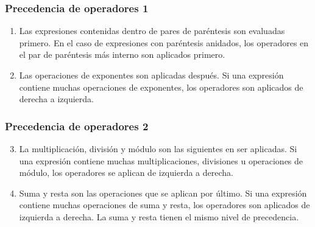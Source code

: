 \documentclass[12pt]{beamer}
\begin{document}
\begin{frame}
\frametitle{Precedencia de operadores 1}
\begin{enumerate}
\item Las expresiones contenidas dentro de pares de par\'{e}ntesis son evaluadas primero. En el caso de expresiones con par\'{e}ntesis anidados, los operadores en el par de par\'{e}ntesis m\'{a}s interno son aplicados primero.
\item Las operaciones de exponentes son aplicadas despu\'{e}s. Si una expresi\'{o}n contiene muchas operaciones de exponentes, los operadores son aplicados de derecha a izquierda.
\end{enumerate}
\end{frame}
\begin{frame}
\frametitle{Precedencia de operadores 2}
\begin{enumerate}
\setcounter{enumi}{2}
\item La multiplicaci\'{o}n, divisi\'{o}n y m\'{o}dulo son las siguientes en ser aplicadas. Si una expresi\'{o}n contiene muchas multiplicaciones, divisiones u operaciones de m\'{o}dulo, los operadores se aplican de izquierda a derecha.
\item Suma y resta son las operaciones que se aplican por \'{u}ltimo. Si una expresi\'{o}n contiene muchas operaciones de suma y resta, los operadores son aplicados de izquierda a derecha. La suma y resta tienen el mismo nivel de precedencia.
\end{enumerate}
\end{frame}
\end{document}

